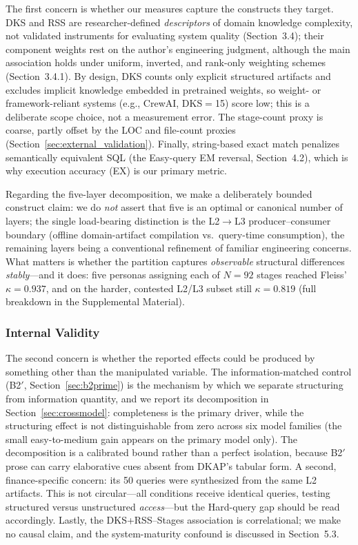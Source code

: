 \documentclass[fleqn,10pt,lineno]{wlpeerj}
\begin{document}
The first concern is whether our measures capture the constructs they target. DKS and RSS are researcher-defined \textit{descriptors} of domain knowledge complexity, not validated instruments for evaluating system quality (Section~3.4); their component weights rest on the author's engineering judgment, although the main association holds under uniform, inverted, and rank-only weighting schemes (Section~3.4.1). By design, DKS counts only explicit structured artifacts and excludes implicit knowledge embedded in pretrained weights, so weight- or framework-reliant systems (e.g., CrewAI, DKS$=$15) score low; this is a deliberate scope choice, not a measurement error. The stage-count proxy is coarse, partly offset by the LOC and file-count proxies (Section~\ref{sec:external_validation}). Finally, string-based exact match penalizes semantically equivalent SQL (the Easy-query EM reversal, Section~4.2), which is why execution accuracy (EX) is our primary metric.

Regarding the five-layer decomposition, we make a deliberately bounded construct claim: we do \textit{not} assert that five is an optimal or canonical number of layers; the single load-bearing distinction is the L2$\rightarrow$L3 producer--consumer boundary (offline domain-artifact compilation vs.\ query-time consumption), the remaining layers being a conventional refinement of familiar engineering concerns. What matters is whether the partition captures \textit{observable} structural differences \textit{stably}---and it does: five personas assigning each of $N=92$ stages reached Fleiss' $\kappa = 0.937$, and on the harder, contested L2/L3 subset still $\kappa = 0.819$ (full breakdown in the Supplemental Material).

\subsubsection{Internal Validity}

The second concern is whether the reported effects could be produced by something other than the manipulated variable. The information-matched control (B2$'$, Section~\ref{sec:b2prime}) is the mechanism by which we separate structuring from information quantity, and we report its decomposition in Section~\ref{sec:crossmodel}: completeness is the primary driver, while the structuring effect is not distinguishable from zero across six model families (the small easy-to-medium gain appears on the primary model only). The decomposition is a calibrated bound rather than a perfect isolation, because B2$'$ prose can carry elaborative cues absent from DKAP's tabular form. A second, finance-specific concern: its 50 queries were synthesized from the same L2 artifacts. This is not circular---all conditions receive identical queries, testing structured versus unstructured \textit{access}---but the Hard-query gap should be read accordingly. Lastly, the DKS+RSS--Stages association is correlational; we make no causal claim, and the system-maturity confound is discussed in Section~5.3.
\end{document}
